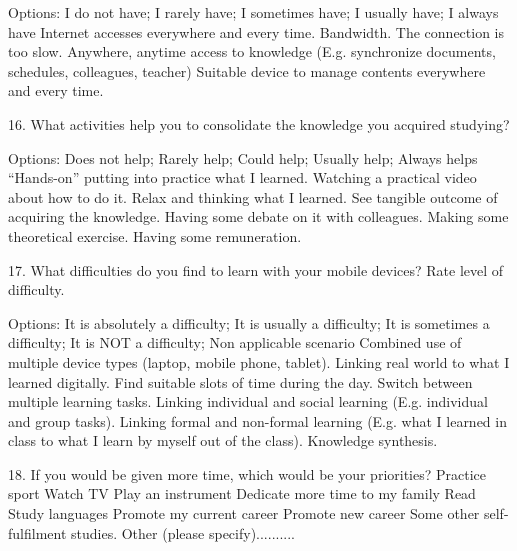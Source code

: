 \begin{small}
Options: I do not have; I rarely have; I sometimes have; I usually have; I always have
\hfill \break {}  Internet accesses everywhere and every time.					
\hfill \break {}  Bandwidth. The connection is too slow.					
\hfill \break {}  Anywhere, anytime access to knowledge (E.g. synchronize documents, schedules, colleagues, teacher)					
\hfill \break {}  Suitable device to manage contents everywhere and every time.					


16. What activities help you to consolidate the knowledge you acquired studying? 

Options: Does not help; Rarely help; Could help; Usually help; Always helps
\hfill \break {}  “Hands-on” putting into practice what I learned.					
\hfill \break {}  Watching a practical video about how to do it.					
\hfill \break {}  Relax and thinking what I learned.					
\hfill \break {}  See tangible outcome of acquiring the knowledge.					
\hfill \break {}  Having some debate on it with colleagues.					
\hfill \break {}  Making some theoretical exercise.					
\hfill \break {}  Having some remuneration.					


17. What difficulties do you find to learn with your mobile devices? Rate level of difficulty. 

Options: It is absolutely a difficulty; It is usually a difficulty; It is sometimes a difficulty; It is NOT a difficulty; Non applicable scenario
\hfill \break {}  Combined use of multiple device types (laptop, mobile phone, tablet).					
\hfill \break {}  Linking real world to what I learned digitally.					
\hfill \break {}  Find suitable slots of time during the day.					
\hfill \break {}  Switch between multiple learning tasks.					
\hfill \break {}  Linking individual and social learning (E.g. individual and group tasks).					
\hfill \break {}  Linking formal and non-formal learning (E.g. what I learned in class to what I learn by myself  out of the class).					
\hfill \break {}  Knowledge synthesis.					


18. If you would be given more time, which would be your priorities? 
\hfill \break {}  Practice sport
\hfill \break {}  Watch TV
\hfill \break {}  Play an instrument
\hfill \break {}  Dedicate more time to my family
\hfill \break {}  Read
\hfill \break {}  Study languages
\hfill \break {}  Promote my current career
\hfill \break {}  Promote new career
\hfill \break {}  Some other self-fulfilment studies. 
\hfill \break {}  Other (please specify)..........					


\end{small}
